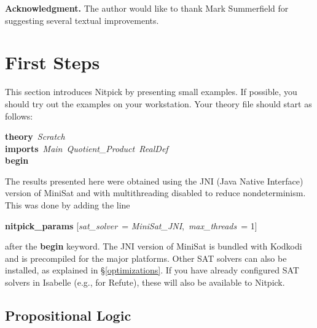 \documentclass[a4paper,12pt]{article}
\begin{document}
\textbf{Acknowledgment.} The author would like to thank Mark Summerfield for
suggesting several textual improvements.

%
%
%

\section{First Steps}
\label{first-steps}

This section introduces Nitpick by presenting small examples. If possible, you
should try out the examples on your workstation. Your theory file should start
as follows:

\prew
\textbf{theory}~\textit{Scratch} \\
\textbf{imports}~\textit{Main~Quotient\_Product~RealDef} \\
\textbf{begin}
\postw

The results presented here were obtained using the JNI (Java Native Interface)
version of MiniSat and with multithreading disabled to reduce nondeterminism.
This was done by adding the line

\prew
\textbf{nitpick\_params} [\textit{sat\_solver}~= \textit{MiniSat\_JNI}, \,\textit{max\_threads}~= 1]
\postw

after the \textbf{begin} keyword. The JNI version of MiniSat is bundled with
Kodkodi and is precompiled for the major platforms. Other SAT solvers can also
be installed, as explained in \S\ref{optimizations}. If you have already
configured SAT solvers in Isabelle (e.g., for Refute), these will also be
available to Nitpick.

\subsection{Propositional Logic}
\label{propositional-logic}
\end{document}
